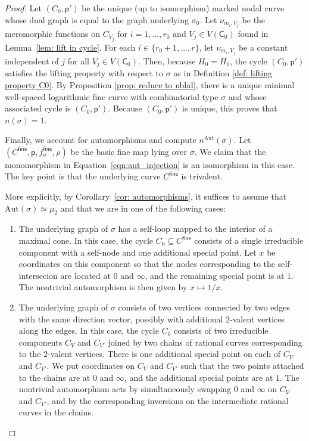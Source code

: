 \documentclass{article}
\newcommand{\tropC}{\mathsf{C}}
\newcommand{\fine}{\mathsf{fine}}
\newcommand{\nn}{n^{\operatorname{Aut}}}
\begin{document}
\begin{proof}
    Let $(C_0, \mathsf{p}')$ be the unique (up to isomorphism) marked nodal curve whose dual graph is equal to the graph underlying $\sigma_0$. Let $\nu_{m_i, V_j}$ be the meromorphic functions on $C_{V_j}$ for $i = 1, \ldots, r_0$ and $V_j \in V(\tropC_0)$ found in Lemma~\ref{lem: lift in cycle}. For each $i \in \{r_0+1, \ldots, r\}$, let $\nu_{m_i, V_j}$ be a constant independent of $j$ for all $V_j \in V(\tropC_0)$. Then, because $H_0=H_1$, the cycle $(C_0, \mathsf{p}')$ satisfies the lifting property with respect to $\sigma$ as in Definition \ref{def: lifting property C0}. 
    By Proposition \ref{prop: reduce to nbhd}, there is a unique minimal well-spaced logarithmic fine curve with combinatorial type $\sigma$ and whose associated cycle is $(C_0, \mathsf{p}')$. Because $(C_0, \mathsf{p}')$ is unique, this proves that $n(\sigma)=1$.
    
    Finally, we account for automorphisms and compute $\nn(\sigma)$. Let $(C^\fine,\mathsf{p}, f_\sigma^\fine, \rho)$ be the basic fine map lying over $\sigma$. We claim that the monomorphism in Equation~\eqref{eqn:aut_injection} is an isomorphism in this case. The key point is that the underlying curve $\underline{C}^\fine$ is trivalent.

    More explicitly, by Corollary~\ref{cor: automorphisms}, it suffices to assume that $\mathrm{Aut}(\sigma) \simeq \mu_2$ and that we are in one of the following cases:

\begin{enumerate}
    \item[$\bullet$] The underlying graph of $\sigma$ has a self-loop mapped to the interior of a maximal cone. In this case, the cycle $C_0 \subseteq C^\fine$ consists of a single irreducible component with a self-node and one additional special point. Let $x$ be coordinates on this component so that the nodes corresponding to the self-intersecion are located at $0$ and $\infty$, and the remaining special point is at $1$. The nontrivial automorphism is then given by
    $
    x \mapsto 1/x.
    $

    \item[$\bullet$] The underlying graph of $\sigma$ consists of two vertices connected by two edges with the same direction vector, possibly with additional $2$-valent vertices along the edges. In this case, the cycle $C_0$ consists of two irreducible components $C_{V}$ and $C_{V'}$ joined by two chains of rational curves corresponding to the $2$-valent vertices. There is one additional special point on each of $C_{V}$ and $C_{V'}$. We put coordinates on $C_{V}$ and $C_{V'}$ such that the two points attached to the chains are at $0$ and $\infty$, and the additional special points are at $1$. The nontrivial automorphism acts by simultaneously swapping $0$ and $\infty$ on $C_{V}$ and $C_{V'}$, and by the corresponding inversions on the intermediate rational curves in the chains.


    
\end{enumerate}
    
    
    
\end{proof}
\end{document}
